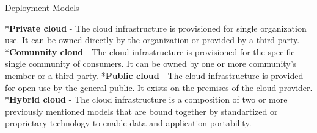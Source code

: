 \seccc Deployment Models

\begitems
	*{\bf Private cloud} - The cloud infrastructure is provisioned for single organization use. It can be owned directly by the organization or provided by a third party.
	*{\bf Comunnity cloud} - The cloud infrastructure is provisioned for the specific single community of consumers. It can be owned by one or more community's member or a third party.
	*{\bf Public cloud} - The cloud infrastructure is provided for open use by the general public. It exists on the premises of the cloud provider.
	*{\bf Hybrid cloud} - The cloud infrastructure is a composition of two or more previously mentioned models that are bound together by standartized or proprietary technology to enable data and application portability.
	
\enditems




